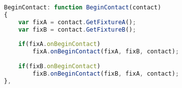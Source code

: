 \begin{lstlisting}[language=JavaScript]
BeginContact: function BeginContact(contact)
{
	var fixA = contact.GetFixtureA();
	var fixB = contact.GetFixtureB();
	
	if(fixA.onBeginContact)
		fixA.onBeginContact(fixA, fixB, contact);
		
	if(fixB.onBeginContact)
		fixB.onBeginContact(fixB, fixA, contact);
},
\end{lstlisting}
